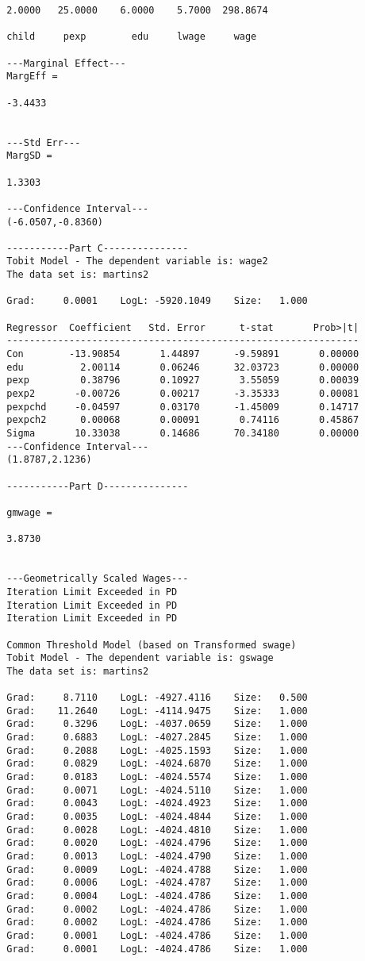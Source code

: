 \documentclass[12pt]{article}
\begin{document}
\begin{verbatim}
		2.0000   25.0000    6.0000    5.7000  298.8674
		
		child     pexp        edu     lwage     wage
		
		---Marginal Effect---
		MargEff =
		
		-3.4433
		
		
		---Std Err---
		MargSD =
		
		1.3303
		
		---Confidence Interval---
		(-6.0507,-0.8360)
		
		-----------Part C--------------- 
		Tobit Model - The dependent variable is: wage2
		The data set is: martins2
		
		Grad:     0.0001    LogL: -5920.1049    Size:   1.000
		
		Regressor  Coefficient	 Std. Error 	 t-stat       Prob>|t|
		--------------------------------------------------------------
		Con        -13.90854       1.44897      -9.59891       0.00000 
		edu          2.00114       0.06246      32.03723       0.00000 
		pexp         0.38796       0.10927       3.55059       0.00039 
		pexp2       -0.00726       0.00217      -3.35333       0.00081 
		pexpchd     -0.04597       0.03170      -1.45009       0.14717 
		pexpch2      0.00068       0.00091       0.74116       0.45867 
		Sigma       10.33038       0.14686      70.34180       0.00000 
		---Confidence Interval---
		(1.8787,2.1236)
		
		-----------Part D--------------- 
		
		gmwage =
		
		3.8730
		
		
		---Geometrically Scaled Wages--- 
		Iteration Limit Exceeded in PD
		Iteration Limit Exceeded in PD
		Iteration Limit Exceeded in PD
		
		Common Threshold Model (based on Transformed swage)
		Tobit Model - The dependent variable is: gswage
		The data set is: martins2
		
		Grad:     8.7110    LogL: -4927.4116    Size:   0.500
		Grad:    11.2640    LogL: -4114.9475    Size:   1.000
		Grad:     0.3296    LogL: -4037.0659    Size:   1.000
		Grad:     0.6883    LogL: -4027.2845    Size:   1.000
		Grad:     0.2088    LogL: -4025.1593    Size:   1.000
		Grad:     0.0829    LogL: -4024.6870    Size:   1.000
		Grad:     0.0183    LogL: -4024.5574    Size:   1.000
		Grad:     0.0071    LogL: -4024.5110    Size:   1.000
		Grad:     0.0043    LogL: -4024.4923    Size:   1.000
		Grad:     0.0035    LogL: -4024.4844    Size:   1.000
		Grad:     0.0028    LogL: -4024.4810    Size:   1.000
		Grad:     0.0020    LogL: -4024.4796    Size:   1.000
		Grad:     0.0013    LogL: -4024.4790    Size:   1.000
		Grad:     0.0009    LogL: -4024.4788    Size:   1.000
		Grad:     0.0006    LogL: -4024.4787    Size:   1.000
		Grad:     0.0004    LogL: -4024.4786    Size:   1.000
		Grad:     0.0002    LogL: -4024.4786    Size:   1.000
		Grad:     0.0002    LogL: -4024.4786    Size:   1.000
		Grad:     0.0001    LogL: -4024.4786    Size:   1.000
		Grad:     0.0001    LogL: -4024.4786    Size:   1.000
		

\end{verbatim}
\end{document}
